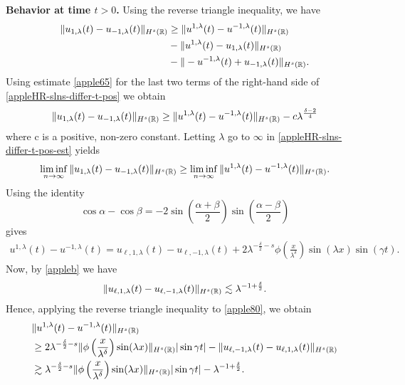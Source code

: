 \textbf{Behavior at time  $t>0$.}  Using the reverse triangle inequality, we 
have
%
%
%
%
%
\begin{equation} \label{appleHR-slns-differ-t-pos}
\begin{split}
\|
u_{1,\lambda}(t)
-
u_{- 1,\lambda}(t)
\|_{H^s(\mathbb{R})}
&
\ge
\|
u^{1,\lambda}(t)
-
u^{- 1,\lambda}(t)
\|_{H^s(\mathbb{R})}
\\
& -
\|
u^{1,\lambda}(t)
-
u_{1,\lambda}(t)
\|_{H^s(\mathbb{R})}
\\
& -
\|
-u^{-1,\lambda}(t)
+
u_{-1,\lambda}(t)
\|_{H^s(\mathbb{R})} .
\end{split}
\end{equation}
%
%
%
%
Using estimate \eqref{apple65} for the last two terms of 
the right-hand side of \eqref{appleHR-slns-differ-t-pos} we obtain
%
%
%
%
%
\begin{equation} \label{appleHR-slns-differ-t-pos-est}
\|
u_{1,\lambda}(t)
-
u_{- 1,\lambda}(t)
\|_{H^s(\mathbb{R})}
\ge
\|
u^{1,\lambda}(t)
-
u^{- 1,\lambda}(t)
\|_{H^s(\mathbb{R})}
-
c \lambda^{\frac{\delta - 2}{4}}
\end{equation}
%
%
where c is a positive, non-zero constant. Letting $\lambda$ go to $\infty$ 
in
\eqref{appleHR-slns-differ-t-pos-est}
yields
%
%
%
\begin{equation} \label{appleHR-slns-to-ap-est}
\liminf_{n\to\infty}
\|
u_{1,\lambda}(t)
-
u_{- 1,\lambda}(t)
\|_{H^s(\mathbb{R})}
\ge
\liminf_{n\to\infty}
\|
u^{1,\lambda}(t)
-
u^{- 1,\lambda}(t)
\|_{H^s(\mathbb{R})}.
\end{equation}
%
%
%
%
Using the identity $$
\cos \alpha -\cos \beta
=
-2
\sin(\frac{\alpha + \beta}{2})
\sin(\frac{\alpha - \beta}{2})
$$
gives
%
%
\begin{equation}
\label{apple80}
\begin{split}
u^{1,\lambda}(t)
-
u^{- 1,\lambda}(t)
=
u_{\ell,1,\lambda}(t) - u_{\ell,-1,\lambda}(t) + 
2\lambda^{-\frac{\delta}{2}-s}
\phi\left( \frac{x}{\lambda^\delta} \right)\sin(\lambda x) \sin(\gamma t).
\end{split}
\end{equation}
%
%
Now, by  \cref{appleb} we have
%
%
\begin{equation*}
\begin{split}
\|u_{\ell,1,\lambda}(t) - u_{\ell,-1,\lambda}(t)\|_{H^s(\mathbb{R})} \lesssim
\lambda^{-1 + \frac{\delta}{2}}.
\end{split}
\end{equation*}
%
%
Hence, applying the reverse triangle inequality to \eqref{apple80}, we 
obtain
%
%
\begin{equation} \label{apple90}
\begin{split}
& \|
u^{1,\lambda}(t)
-
u^{- 1,\lambda}(t)
\|_{H^s(\mathbb{R})}
\\
& \ge 2 \lambda^{-\frac{\delta}{2}-s} \|\phi\left(
\frac{x}{\lambda^\delta} \right) \sin(\lambda x) \|_{H^s(\mathbb{R})} |\sin \gamma 
t|
- \|u_{\ell,-1,\lambda}(t) - u_{\ell,1,\lambda}(t)\|_{H^s(\mathbb{R})} \\
& \gtrsim \lambda^{-\frac{\delta}{2}-s} \|\phi\left(
\frac{x}{\lambda^\delta} \right ) \sin(\lambda x) \|_{H^s(\mathbb{R})} |\sin 
\gamma t| -
\lambda^{-1 + \frac{\delta}{2}}.
\end{split}
\end{equation}
